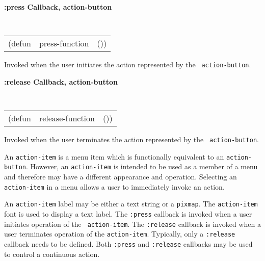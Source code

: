 
{\samepage
{\large {\bf :press \hfill Callback, action-button}} 
\begin{flushright} 
\parbox[t]{6.125in}{
\tt
\begin{tabular}{lll}
\raggedright
(defun & press-function & ())
\end{tabular}
\rm

}\end{flushright}}

\begin{flushright} \parbox[t]{6.125in}{
Invoked when the user initiates the action represented by the {\tt
action-button}.

}\end{flushright}

 
{\samepage
{\large {\bf :release \hfill Callback, action-button}} 
\begin{flushright} 
\parbox[t]{6.125in}{
\tt
\begin{tabular}{lll}
\raggedright
(defun & release-function & ())
\end{tabular}
\rm

}\end{flushright}}

\begin{flushright} \parbox[t]{6.125in}{
Invoked when the user terminates the action represented by the {\tt
action-button}.


}\end{flushright}

  





\vfill\pagebreak



An {\tt action-item} is a menu item which is functionally equivalent to an
{\tt action-button}. However, an {\tt action-item} is intended to be used as a
member of a menu and therefore may have a different appearance and
operation.  Selecting an {\tt action-item} in a menu allows a user to
immediately invoke an action.

An {\tt action-item} label may be either a text string or a {\tt pixmap}. The
{\tt action-item} font is used to display a text label.
The {\tt :press} callback is invoked when a user initiates operation of the {\tt
action-item}.  The {\tt :release} callback is invoked when a user terminates
operation of the {\tt action-item}.  Typically, only a {\tt :release} callback
needs to be defined.  Both {\tt :press} and {\tt :release} callbacks may be used
to control a continuous action.


